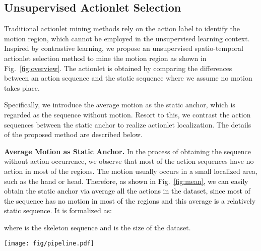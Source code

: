 \documentclass[twocolumn]{article}
\newcommand{\wh}[1]{\textcolor{black}{#1}}
\begin{document}
\subsection{Unsupervised Actionlet Selection}
\label{sec:actionlet}
Traditional actionlet mining methods rely on the action label to identify the motion region, which cannot be employed in the unsupervised learning context.
Inspired by contrastive learning, we propose an unsupervised spatio-temporal actionlet selection \wh{method} to mine the motion region as shown in Fig.~\ref{fig:overview}.
The actionlet is \wh{obtained} by comparing the differences between \wh{an} action sequence and the static sequence where we assume no motion takes place.

Specifically, we introduce the average motion as the static anchor, which is regarded as the sequence without motion. Resort to this, we contrast the action sequences between the static anchor to realize actionlet localization. The details of the proposed method are described below.
\vspace{1mm}

\noindent\textbf{Average Motion as Static Anchor.}
In the process of obtaining the sequence without action occurrence, we observe that most of the action sequences have no action in most of the regions. The motion usually occurs in a small localized area, such as the hand or head.
\wh{Therefore, as shown in Fig.~\ref{fig:mean}, we can easily obtain the static anchor via average all the actions in the dataset, since most of the sequence has no motion in most of the regions and this average is a relatively static sequence.} 
It is formalized as:

where  is the  skeleton sequence and  is the size of the dataset.
\vspace{1mm}


\begin{figure*}[tb]
\begin{center}
\texttt{[image: fig/pipeline.pdf]}
\end{center}
\caption{
The pipeline of actionlet-dependent contrastive learning. In unsupervised actionlet selection, we employ the difference from the average motion to obtain the region of motion. For contrastive learning, we employ two streams, \textit{i.e.}, the online stream and the offline stream. The above stream is the online stream, which is updated by gradient. The below is the offline stream, which is updated by momentum. We get the augmented data  by performing motion-adaptive data transformation (MATS) on the input data  with the obtained actionlet. In offline feature extraction, we employ semantic-aware feature pooling (SAFP) to obtain the accurate feature anchor. Finally, utilizing similarity mining, we increase the similarity between positives and decrease the similarity between negatives.
}
\label{fig:overview}
\end{figure*}
\end{document}
